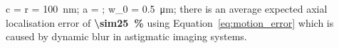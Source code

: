 c = r = \SI{100}{\nano\meter};
a = ;
w_0 = \SI{0.5}{\micro\meter}\);
there is an average expected axial localisation error of \textbf{\SI{\sim25}{\percent}} using Equation~\eqref{eq:motion_error} which is caused by dynamic blur in astigmatic imaging systems.%
%
%
%

